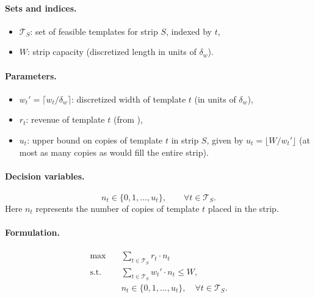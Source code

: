 \documentclass[11pt,a4paper]{article}
\newcommand{\calT}{\mathcal{T}}
\begin{document}
\paragraph{Sets and indices.}
\begin{itemize}[nosep]
    \item $\calT_S$: set of feasible templates for strip $S$, indexed
    by $t$,
    \item $W$: strip capacity (discretized length in units of $\delta_w$).
\end{itemize}

\paragraph{Parameters.}
\begin{itemize}[nosep]
    \item $w_t' = \lceil w_t / \delta_w \rceil$: discretized width of
    template $t$ (in units of $\delta_w$),
    \item $r_t$: revenue of template $t$ (from ),
    \item $u_t$: upper bound on copies of template $t$ in strip $S$,
    given by $u_t = \lfloor W / w_t' \rfloor$ (at most as many copies
    as would fill the entire strip).
\end{itemize}

\paragraph{Decision variables.}
\[
    n_t \in \{0, 1, \ldots, u_t\}, \qquad \forall t \in \calT_S.
\]
Here $n_t$ represents the number of copies of template $t$ placed in
the strip.

\paragraph{Formulation.}
\begin{subequations}\label{eq:knapsack}
\begin{align}
    \max \quad & \sum_{t \in \calT_S} r_t \cdot n_t \label{eq:knapsack-obj}\\[4pt]
    \text{s.t.} \quad & \sum_{t \in \calT_S} w_t' \cdot n_t \leq W, \label{eq:knapsack-cap}\\[4pt]
    & n_t \in \{0, 1, \ldots, u_t\}, \quad \forall t \in \calT_S. \label{eq:knapsack-int}
\end{align}
\end{subequations}
\end{document}
